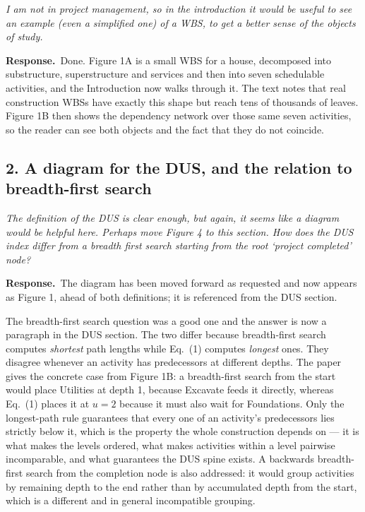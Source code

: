 \documentclass[11pt,a4paper]{article}
\newcommand{\rev}[1]{\medskip\noindent\textit{#1}\par\medskip}
\newcommand{\reply}{\noindent\textbf{Response.}\ }
\begin{document}
\rev{I am not in project management, so in the introduction it would be useful to
see an example (even a simplified one) of a WBS, to get a better sense of the
objects of study.}

\reply Done. Figure 1A is a small WBS for a house, decomposed into substructure,
superstructure and services and then into seven schedulable activities, and the
Introduction now walks through it. The text notes that real construction WBSs
have exactly this shape but reach tens of thousands of leaves. Figure 1B then
shows the dependency network over those same seven activities, so the reader can
see both objects and the fact that they do not coincide.

\subsection*{2. A diagram for the DUS, and the relation to breadth-first search}

\rev{The definition of the DUS is clear enough, but again, it seems like a diagram
would be helpful here. Perhaps move Figure 4 to this section. How does the DUS
index differ from a breadth first search starting from the root `project
completed' node?}

\reply The diagram has been moved forward as requested and now appears as
Figure 1, ahead of both definitions; it is referenced from the DUS section.

The breadth-first search question was a good one and the answer is now a
paragraph in the DUS section. The two differ because breadth-first search
computes \emph{shortest} path lengths while Eq.~(1) computes \emph{longest}
ones. They disagree whenever an activity has predecessors at different depths.
The paper gives the concrete case from Figure 1B: a breadth-first search from
the start would place Utilities at depth 1, because Excavate feeds it directly,
whereas Eq.~(1) places it at $u = 2$ because it must also wait for Foundations.
Only the longest-path rule guarantees that every one of an activity's
predecessors lies strictly below it, which is the property the whole
construction depends on --- it is what makes the levels ordered, what makes
activities within a level pairwise incomparable, and what guarantees the DUS
spine exists. A backwards breadth-first search from the completion node is also
addressed: it would group activities by remaining depth to the end rather than
by accumulated depth from the start, which is a different and in general
incompatible grouping.
\end{document}
